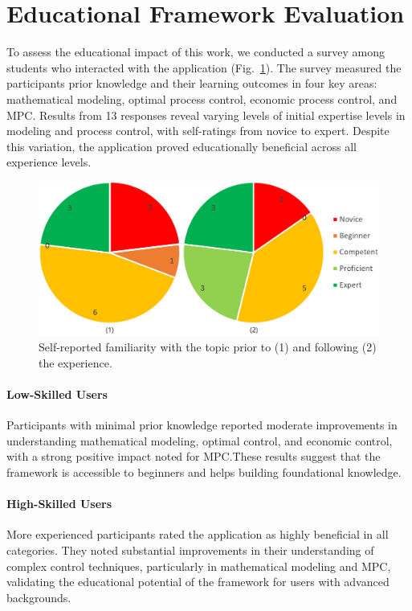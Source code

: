 \documentclass[conference]{IEEEtran}
\begin{document}
\section{Educational Framework Evaluation}
To assess the educational impact of this work, we conducted a survey among students who interacted with the application (Fig.~\ref{fig:feedbackPC}). The survey measured the participants prior knowledge and their learning outcomes in four key areas: mathematical modeling, optimal process control, economic process control, and MPC\@. Results from 13 responses reveal varying levels of initial expertise levels in modeling and process control, with self-ratings from novice to expert. Despite this variation, the application  proved educationally beneficial across all experience levels.

\begin{figure}
    \centering
    \includegraphics[width=\linewidth]{figures/feedbackPC.png}
    \caption{Self-reported familiarity with the topic prior to (1) and following (2) the experience.}\label{fig:feedbackPC}
\end{figure}

\paragraph{Low-Skilled Users}
Participants with minimal prior knowledge reported moderate improvements in understanding mathematical modeling, optimal control, and economic control, with a strong positive impact noted for MPC.\@ These results suggest that the framework is accessible to beginners and helps building foundational knowledge.

\paragraph{High-Skilled Users}
More experienced participants rated the application as highly beneficial in all categories. They noted substantial improvements in their understanding of complex control techniques, particularly in mathematical modeling and MPC, validating the educational potential of the framework for users with advanced backgrounds.
\end{document}
